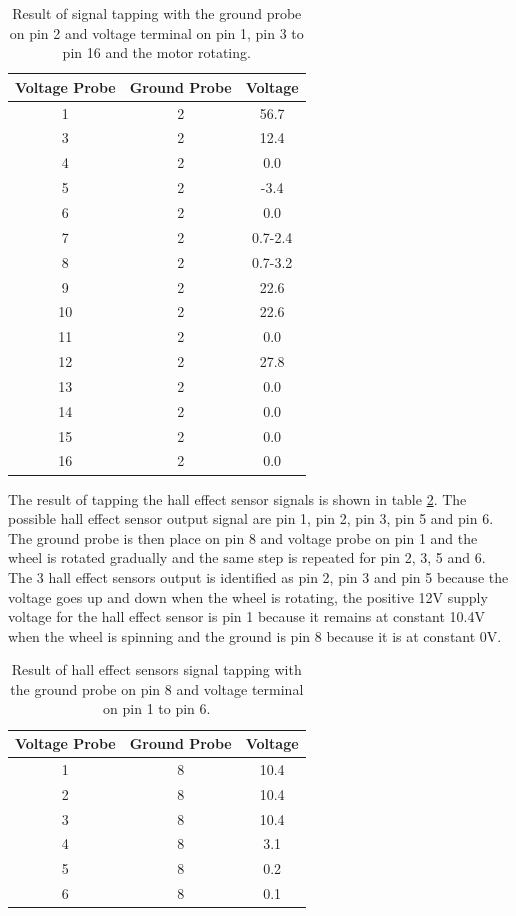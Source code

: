 \begin{table}[htbp]
\begin{center}
\begin{tabular}{|c|c|c|}
\hline
\textbf{Voltage Probe} & \textbf{Ground Probe} & \textbf{Voltage} \\ \hline
1 & 2 & 56.7 \\ \hline
3 & 2 & 12.4 \\ \hline
4 & 2 & 0.0 \\ \hline
5 & 2 & -3.4 \\ \hline
6 & 2 & 0.0 \\ \hline
7 & 2 & 0.7-2.4 \\ \hline
8 & 2 & 0.7-3.2 \\ \hline
9 & 2 & 22.6 \\ \hline
10 & 2 & 22.6 \\ \hline
11 & 2 & 0.0 \\ \hline
12 & 2 & 27.8 \\ \hline
13 & 2 & 0.0 \\ \hline
14 & 2 & 0.0 \\ \hline
15 & 2 & 0.0 \\ \hline
16 & 2 & 0.0 \\ \hline
\end{tabular}
\end{center}
\caption{Result of signal tapping with the ground probe on pin 2 and voltage terminal on pin 1, pin 3 to pin 16 and the motor rotating.}
\label{tb:speedIdenGnd2Running}
\end{table}

The result of tapping the hall effect sensor signals is shown in table \ref{tb:hallIdenGnd8}. The possible hall effect sensor output signal are pin 1, pin 2, pin 3, pin 5 and pin 6. The ground probe is then place on pin 8 and voltage probe on pin 1 and the wheel is rotated gradually and the same step is repeated for pin 2, 3, 5 and 6. The 3 hall effect sensors output is identified as pin 2, pin 3 and pin 5 because the voltage goes up and down when the wheel is rotating, the positive 12V supply voltage for the hall effect sensor is pin 1 because it remains at constant 10.4V when the wheel is spinning and the ground is pin 8 because it is at constant 0V.

\begin{table}[htbp]
\begin{center}
\begin{tabular}{|c|c|c|}
\hline
\textbf{Voltage Probe} & \textbf{Ground Probe} & \textbf{Voltage} \\ \hline
1 & 8 & 10.4 \\ \hline
2 & 8 & 10.4 \\ \hline
3 & 8 & 10.4 \\ \hline
4 & 8 & 3.1 \\ \hline
5 & 8 & 0.2 \\ \hline
6 & 8 & 0.1 \\ \hline
\end{tabular}
\end{center}
\caption{Result of hall effect sensors signal tapping with the ground probe on pin 8 and voltage terminal on pin 1 to pin 6.}
\label{tb:hallIdenGnd8}
\end{table}


